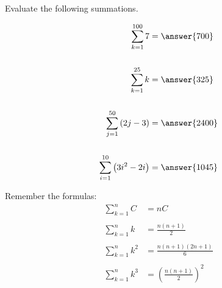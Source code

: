 \documentclass{ximera}
\author{Gregory Hartman \and Matthew Carr \and Bobby Ramsey}
\begin{document}
Evaluate the following summations.
\begin{exercise}
	\begin{align*}
		\sum_{k = 1}^{100} 7 &= \answer{700}\\ \\
		\sum_{k = 1}^{25} k &= \answer{325} \\ \\
		\sum_{j = 1}^{50} \left(2j-3\right) &= \answer{2400} \\ \\
		\sum_{i = 1}^{10} \left( 3i^2-2i \right) &=  \answer{1045}
	\end{align*}
\begin{hint}
	Remember the formulas:
	\begin{align*}
		\sum_{k=1}^{n}  C &= nC\\ \\
		\sum_{k=1}^{n}  k &= \frac{n(n+1)}{2}\\ \\
		\sum_{k=1}^{n}  k^2 &= \frac{n(n+1)(2n+1)}{6}\\ \\
		\sum_{k=1}^{n}  k^3 &= \left( \frac{n(n+1)}{2}\right)^2
	\end{align*}				
\end{hint}

\end{exercise}
\end{document}
